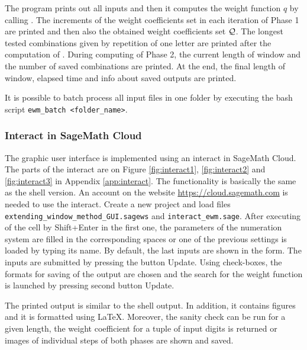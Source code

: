 \begin{upravit}
The program prints out all inputs and then it computes the weight function $q$ by calling . The increments of the weight coefficients set in each iteration of Phase 1 are printed and then also the obtained weight coefficients set $\mathcal{Q}$. The longest tested combinations given by repetition of one letter are printed after the computation of . During computing of Phase 2, the current length of window and the number of saved combinations are printed. At the end, the final length of window, elapsed time and info about saved outputs are printed.  

It is possible to batch process all input files in one folder by executing the bash script \verb+ewm_batch <folder_name>+.  

\subsubsection{Interact in SageMath Cloud}
The graphic user interface is implemented using an interact in SageMath Cloud. The parts of the interact are on Figure \ref{fig:interact1}, \ref{fig:interact2} and \ref{fig:interact3} in Appendix \ref{app:interact}. The functionality is basically the same as the shell version. An account on the website \url{https://cloud.sagemath.com} is needed to use the interact. Create a new project and load files \verb+extending_window_method_GUI.sagews+ and \verb+interact_ewm.sage+. After executing of the cell by Shift+Enter in the first one, the parameters of the numeration system are filled in the corresponding spaces or one of the previous settings is loaded by typing its name.  By default, the last inputs are shown in the form. The inputs are submitted by pressing the button Update. Using check-boxes, the formats for saving of the output are chosen and the search for the weight function is launched by pressing second button Update.

The printed output is similar to the shell output. In addition, it contains figures and it is formatted using \LaTeX. Moreover, the sanity check can be run for a given length, the weight coefficient for a tuple of  input digits is returned or images of individual steps of both phases are shown and saved.


\end{upravit}